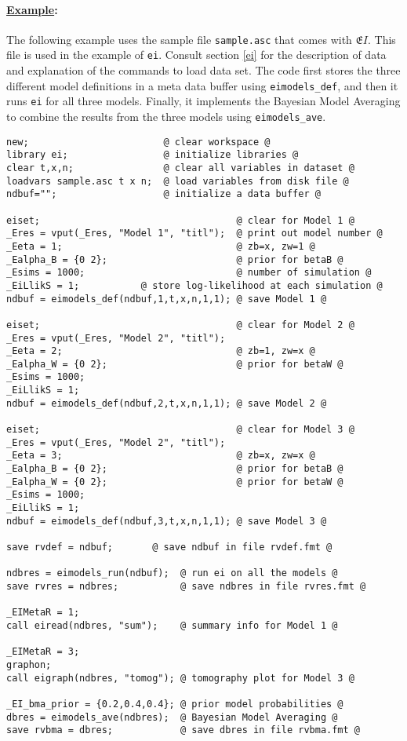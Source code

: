 \documentclass[11pt,titlepage]{article}
\newcommand{\EI}{\ensuremath{{\mathfrak EI}}}
\begin{document}
\paragraph{\underline{Example}:}
The following example uses the sample file \texttt{sample.asc} that comes
with \EI.  This file is used in the example of \texttt{ei}. Consult
section \ref{ei} for the description of data and explanation of the
commands to load data set. The code first stores the three different
model definitions in a meta data buffer using \texttt{eimodels\_def},
and then it runs \texttt{ei} for all three models. Finally, it
implements the Bayesian Model Averaging to combine the results from the
three models using \texttt{eimodels\_ave}. 
\begin{verbatim}
new;                        @ clear workspace @
library ei;                 @ initialize libraries @
clear t,x,n;                @ clear all variables in dataset @
loadvars sample.asc t x n;  @ load variables from disk file @
ndbuf="";                   @ initialize a data buffer @

eiset;                                   @ clear for Model 1 @
_Eres = vput(_Eres, "Model 1", "titl");  @ print out model number @
_Eeta = 1;                               @ zb=x, zw=1 @
_Ealpha_B = {0 2};                       @ prior for betaB @
_Esims = 1000;                           @ number of simulation @
_EiLlikS = 1;           @ store log-likelihood at each simulation @
ndbuf = eimodels_def(ndbuf,1,t,x,n,1,1); @ save Model 1 @

eiset;                                   @ clear for Model 2 @
_Eres = vput(_Eres, "Model 2", "titl");
_Eeta = 2;                               @ zb=1, zw=x @
_Ealpha_W = {0 2};                       @ prior for betaW @
_Esims = 1000;
_EiLlikS = 1;
ndbuf = eimodels_def(ndbuf,2,t,x,n,1,1); @ save Model 2 @

eiset;                                   @ clear for Model 3 @
_Eres = vput(_Eres, "Model 2", "titl");
_Eeta = 3;                               @ zb=x, zw=x @
_Ealpha_B = {0 2};                       @ prior for betaB @
_Ealpha_W = {0 2};                       @ prior for betaW @
_Esims = 1000;
_EiLlikS = 1;
ndbuf = eimodels_def(ndbuf,3,t,x,n,1,1); @ save Model 3 @

save rvdef = ndbuf;       @ save ndbuf in file rvdef.fmt @

ndbres = eimodels_run(ndbuf);  @ run ei on all the models @
save rvres = ndbres;           @ save ndbres in file rvres.fmt @

_EIMetaR = 1;
call eiread(ndbres, "sum");    @ summary info for Model 1 @

_EIMetaR = 3;
graphon;
call eigraph(ndbres, "tomog"); @ tomography plot for Model 3 @

_EI_bma_prior = {0.2,0.4,0.4}; @ prior model probabilities @
dbres = eimodels_ave(ndbres);  @ Bayesian Model Averaging @
save rvbma = dbres;            @ save dbres in file rvbma.fmt @
\end{verbatim}
\end{document}

